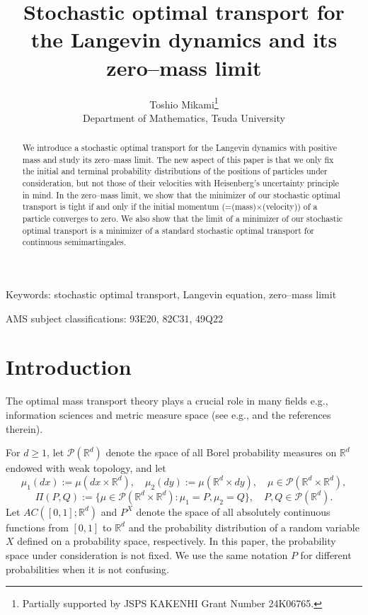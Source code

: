\documentclass[12pt]{article}
\date{ }
\begin{document}
\title{Stochastic optimal transport for the Langevin dynamics and its zero--mass limit
}

\author{
Toshio Mikami\thanks{Partially supported by JSPS KAKENHI Grant Number 24K06765.
}\\
Department of Mathematics, Tsuda University
}


\maketitle

\begin{abstract}
We introduce a stochastic optimal transport for the Langevin dynamics with positive mass and study its zero--mass limit.
The new aspect of this paper is that we only fix the initial and terminal probability distributions of the positions of particles under consideration, but not those of their velocities with Heisenberg's uncertainty principle in mind.
In the zero--mass limit, we show that the minimizer of our stochastic optimal transport is tight if and only if the initial momentum (=(mass)$\times$(velocity)) of a particle converges to zero.
We also show that the limit of a minimizer of our stochastic optimal transport is a minimizer of a standard stochastic optimal transport for continuous semimartingales.
\end{abstract} 

Keywords:  stochastic optimal transport, Langevin equation, zero--mass limit

AMS subject classifications:  93E20, 82C31, 49Q22



\section{Introduction}\label{sec:1}

The optimal mass transport theory plays a crucial role in many fields
e.g.,  information sciences and metric measure space
(see e.g., \cite{1-PC, 1-RR,1-V2} and the references therein).

For $d\ge 1$, let $\mathcal{P}(\mathbb{R}^d)$ denote the space of all Borel probability measures on $\mathbb{R}^d$ endowed with weak topology, and let
$$\mu_1(dx):=\mu(dx\times \mathbb{R}^d),\quad\mu_2(dy):=\mu(\mathbb{R}^d\times dy),\quad
\mu\in \mathcal{P}(\mathbb{R}^d\times \mathbb{R}^d),$$
$$\Pi(P,Q):=\{\mu\in \mathcal{P}(\mathbb{R}^d\times \mathbb{R}^d):
\mu_1=P,\mu_2=Q\},\quad P,Q\in \mathcal{P}(\mathbb{R}^d).$$
Let $AC([0,1];\mathbb{R}^d)$ and $P^{X}$ denote the space of all absolutely continuous functions from $[0,1]$ to $\mathbb{R}^d$ and the probability distribution of a random variable $X$ defined on a probability space, respectively.
In this paper, the probability space under consideration is not fixed.
We use the same notation $P$ for different probabilities when it is not confusing.
\end{document}
